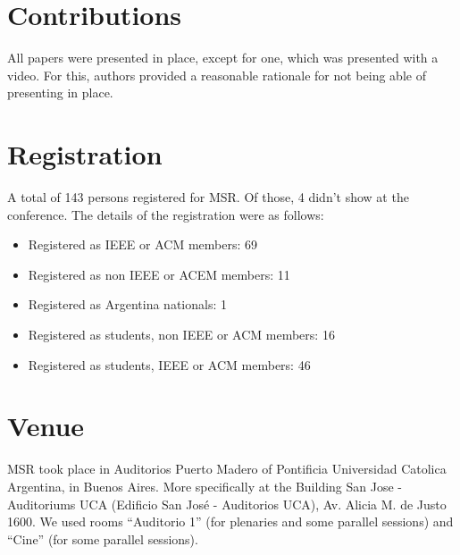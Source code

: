 \documentclass[a4paper]{report}
\begin{document}
\section{Contributions}

All papers were presented in place, except for one, which was presented with a video. For this, authors provided a reasonable rationale for not being able of presenting in place.

\section{Registration}

A total of 143 persons registered for MSR. Of those, 4 didn't show at the conference. The details of the registration were as follows:

\begin{itemize}
\item Registered as IEEE or ACM members: 69
\item Registered as non IEEE or ACEM members: 11
\item Registered as Argentina nationals: 1
\item Registered as students, non IEEE or ACM members: 16
\item Registered as students, IEEE or ACM members: 46 
\end{itemize}

\section{Venue}

MSR took place in Auditorios Puerto Madero of Pontificia Universidad Catolica Argentina, in Buenos Aires. More specifically at the Building San Jose - Auditoriums UCA (Edificio San José - Auditorios UCA), Av. Alicia M. de Justo 1600. We used rooms ``Auditorio 1'' (for plenaries and some parallel sessions) and ``Cine'' (for some parallel sessions).


\end{document}
